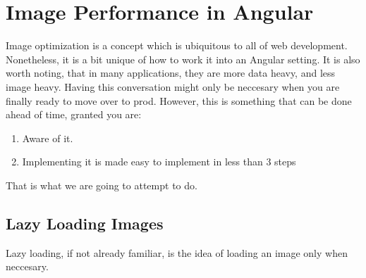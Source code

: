 \chapter{ Image Performance in Angular }

Image optimization is a concept which is ubiquitous to all of web development.
Nonetheless, it is a bit unique of how to work it into an Angular setting. It 
is also worth noting, that in many applications, they are more data heavy, and 
less image heavy. Having this conversation might only be neccesary when you 
are finally ready to move over to prod. However, this is something that can be 
done ahead of time, granted you are: 
\begin{enumerate}
  \item Aware of it. 
  \item Implementing it is made easy to implement in less than 3 steps
\end{enumerate}

That is what we are going to attempt to do. 

\section{Lazy Loading Images}
Lazy loading, if not already familiar, is the idea of loading an image only
when neccesary. 